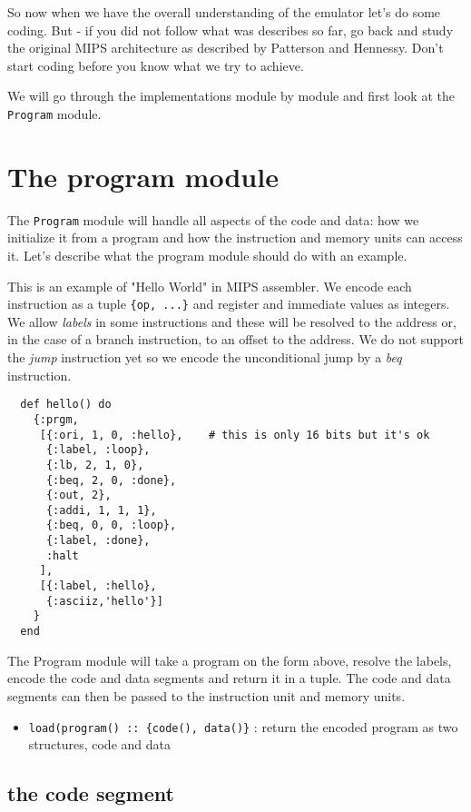 \documentclass[a4paper,11pt]{article}
\begin{document}
So now when we have the overall understanding of the emulator let's do
some coding. But - if you did not follow what was describes so far, go
back and study the original MIPS architecture as described by
Patterson and Hennessy. Don't start coding before you know what we try
to achieve.

We will go through the implementations module by module and first look
at the {\tt Program} module.


\section*{The program module}

The {\tt Program} module will handle all aspects of the code and data:
how we initialize it from a program and how the instruction and memory
units can access it. Let's describe what the program module should do
with an example.

This is an example of "Hello World" in MIPS assembler. We encode each
instruction as a tuple {\tt \{op, ...\}} and register and immediate
values as integers. We allow {\em labels} in some instructions and
these will be resolved to the address or, in the case of a branch
instruction, to an offset to the address. We do not support
the {\em jump} instruction yet so we encode the unconditional jump by
a {\em beq} instruction. 

\begin{verbatim}
  def hello() do
    {:prgm, 
     [{:ori, 1, 0, :hello},    # this is only 16 bits but it's ok 
      {:label, :loop},
      {:lb, 2, 1, 0},
      {:beq, 2, 0, :done},
      {:out, 2},
      {:addi, 1, 1, 1},
      {:beq, 0, 0, :loop},
      {:label, :done},
      :halt
     ],
     [{:label, :hello},
      {:asciiz,'hello'}]
    }
  end
\end{verbatim}

The Program module will take a program on the form above, resolve the
labels, encode the code and data segments and return it in a
tuple. The code and data segments can then be passed to the instruction
unit and memory units.

\begin{itemize}
\item {\tt load(program() :: \{code(), data()\}} : return the encoded program as two structures, code and data
\end{itemize}

\subsection*{the code segment}
\end{document}

